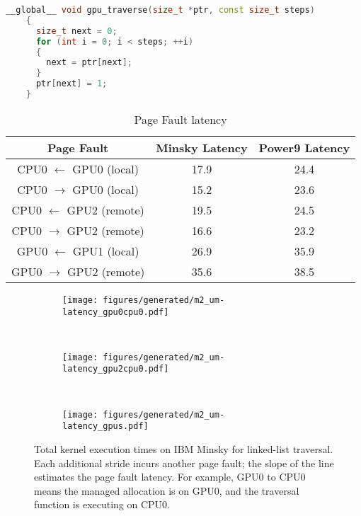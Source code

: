 \begin{lstlisting}[language=c++, caption=Linked List Traversal, label=lst:traversal]
    __global__ void gpu_traverse(size_t *ptr, const size_t steps)
    {
      size_t next = 0;
      for (int i = 0; i < steps; ++i)
      {
        next = ptr[next];
      }
      ptr[next] = 1;
    }
\end{lstlisting}
    

\begin{table}[h]
	\centering
	\caption[]{Page Fault latency}
	\label{tab:page-fault-latency}
	\begin{tabular}{|c|c|c|}
		\hline
		\textbf{Page Fault} & \textbf{Minsky Latency} & \textbf{Power9 Latency} \\ \hline
		CPU0 $\leftarrow$ GPU0  (local) & 17.9 & 24.4   \\ \hline
        CPU0 $\rightarrow$ GPU0 (local) & 15.2 & 23.6  \\ \hline
        CPU0 $\leftarrow$ GPU2  (remote) & 19.5 & 24.5   \\ \hline
        CPU0 $\rightarrow$ GPU2 (remote) & 16.6 & 23.2  \\ \hline
        GPU0 $\leftarrow$ GPU1  (local) & 26.9 & 35.9   \\ \hline
		GPU0 $\rightarrow$ GPU2 (remote) & 35.6 & 38.5  \\ \hline
	\end{tabular}
\end{table}


\begin{figure}[ht]
    \centering
    \begin{subfigure}[b]{0.3\textwidth}
        \texttt{[image: figures/generated/m2\_um-latency\_gpu0cpu0.pdf]}
        \caption{}
        \label{}
    \end{subfigure}
    ~
    \begin{subfigure}[b]{0.3\textwidth}
        \texttt{[image: figures/generated/m2\_um-latency\_gpu2cpu0.pdf]}
        \caption{}
        \label{}
    \end{subfigure}
    ~
    \begin{subfigure}[b]{0.3\textwidth}
        \texttt{[image: figures/generated/m2\_um-latency\_gpus.pdf]}
        \caption{}
        \label{}
    \end{subfigure}
    \caption[]{ 
        Total kernel execution times on IBM Minsky for linked-list traversal.
        Each additional stride incurs another page fault; the slope of the line estimates the page fault latency.
        For example, GPU0 to CPU0 means the managed allocation is on GPU0, and the traversal function is executing on CPU0.
    }
    \label{fig:minsky-page-fault-latency}
\end{figure}


